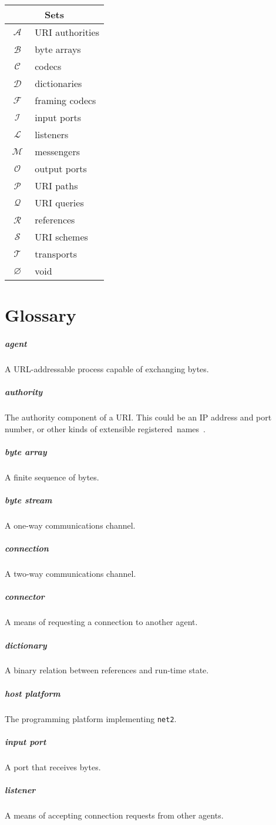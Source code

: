 \documentclass[letterpaper,12pt,openany]{report}
\newcommand{\NetTwo}{\texttt{net2}}
\DeclareMathOperator{\As}{\ensuremath{\mathcal{A}}}
\DeclareMathOperator{\Bs}{\ensuremath{\mathcal{B}}}
\DeclareMathOperator{\Cs}{\ensuremath{\mathcal{C}}}
\DeclareMathOperator{\Ds}{\ensuremath{\mathcal{D}}}
\DeclareMathOperator{\Fs}{\ensuremath{\mathcal{F}}}
\DeclareMathOperator{\Is}{\ensuremath{\mathcal{I}}}
\DeclareMathOperator{\Ls}{\ensuremath{\mathcal{L}}}
\DeclareMathOperator{\Ms}{\ensuremath{\mathcal{M}}}
\DeclareMathOperator{\Os}{\ensuremath{\mathcal{O}}}
\DeclareMathOperator{\Ps}{\ensuremath{\mathcal{P}}}
\DeclareMathOperator{\Qs}{\ensuremath{\mathcal{Q}}}
\DeclareMathOperator{\Rs}{\ensuremath{\mathcal{R}}}
\DeclareMathOperator{\Ss}{\ensuremath{\mathcal{S}}}
\DeclareMathOperator{\Ts}{\ensuremath{\mathcal{T}}}
\DeclareMathOperator{\Void}{\ensuremath{\varnothing}}
\newcommand{\GlossaryItem}[2]{
  \paragraph{#1} #2\vspace{-1ex}
}
\begin{document}
\begin{tabular}{|c|l|}
  \hline
  \multicolumn{2}{|c|}{Sets} \\
  \hline
  $\As$ & URI authorities \\
  $\Bs$ & byte arrays \\
  $\Cs$ & codecs \\
  $\Ds$ & dictionaries \\
  $\Fs$ & framing codecs \\
  $\Is$ & input ports \\
  $\Ls$ & listeners \\
  $\Ms$ & messengers \\
  $\Os$ & output ports \\
  $\Ps$ & URI paths \\
  $\Qs$ & URI queries \\
  $\Rs$ & references \\
  $\Ss$ & URI schemes \\
  $\Ts$ & transports \\
  $\Void$ & void \\
  \hline
\end{tabular}

\chapter{Glossary}
\label{cha:glossary}

\GlossaryItem{agent}{A URL-addressable process capable of exchanging bytes.}

\GlossaryItem{authority}{The authority component of a URI. This could be an IP
  address and port number, or other kinds of extensible
  registered~names~\cite{berners2014rfc}.}

\GlossaryItem{byte array}{A finite sequence of bytes.}

\GlossaryItem{byte stream}{A one-way communications channel.}

\GlossaryItem{connection}{A two-way communications channel.}

\GlossaryItem{connector}{A means of requesting a connection to another agent.}

\GlossaryItem{dictionary}{A binary relation between references and run-time
  state.}

\GlossaryItem{host platform}{The programming platform implementing {\NetTwo}.}

\GlossaryItem{input port}{A port that receives bytes.}

\GlossaryItem{listener}{A means of accepting connection requests from other
  agents.}
\end{document}
